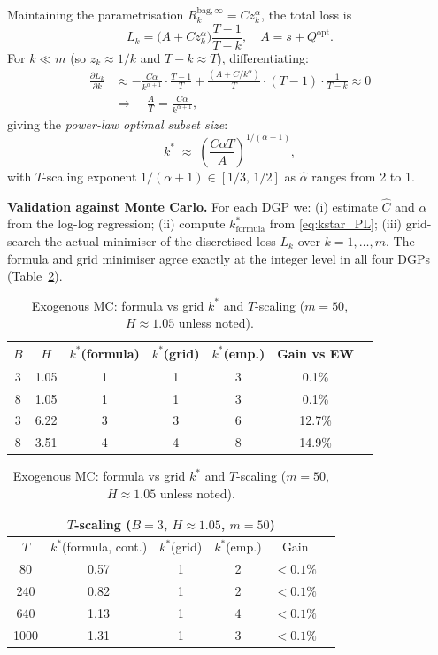 \documentclass[12pt,a4paper]{article}
\theoremstyle{definition}
\newcommand{\Qopt}{Q^{\mathrm{opt}}}
\newcommand{\Rk}{R_k^{\mathrm{bag},\infty}}
\begin{document}
Maintaining the parametrisation $\Rk=Cz_k^\alpha$, the total loss is
\begin{equation}\label{eq:Ltotal_PL}
  L_k = \bigl(A + Cz_k^\alpha\bigr)\frac{T-1}{T-k},\quad A=s+\Qopt.
\end{equation}
For $k\ll m$ (so $z_k\approx 1/k$ and $T-k\approx T$), differentiating:
\begin{align}
  \frac{\partial L_k}{\partial k}
  &\approx -\frac{C\alpha}{k^{\alpha+1}}\cdot\frac{T-1}{T}
           + \frac{(A+C/k^\alpha)}{T}\cdot(T-1)\cdot\frac{1}{T-k}
  \approx 0\nonumber\\
  &\Longrightarrow\quad
  \frac{A}{T} = \frac{C\alpha}{k^{\alpha+1}},
\end{align}
giving the \emph{power-law optimal subset size}:
\begin{equation}\label{eq:kstar_PL}
  k^* \;\approx\; \left(\frac{C\alpha T}{A}\right)^{1/(\alpha+1)},
\end{equation}
with $T$-scaling exponent $1/(\alpha+1)\in[1/3,\,1/2]$ as $\hat\alpha$
ranges from 2 to 1.

\textbf{Validation against Monte Carlo.}
For each DGP we: (i) estimate $\hat C$ and $\hat\alpha$ from the
log-log regression; (ii) compute $k^*_{\mathrm{formula}}$ from
\eqref{eq:kstar_PL}; (iii) grid-search the actual minimiser of the
discretised loss $L_k$ over $k=1,\ldots,m$.  The formula and grid minimiser
agree exactly at the integer level in all four DGPs (Table~\ref{tab:exo_kstar}).

\begin{table}[ht]
\centering
\caption{Exogenous MC: formula vs grid $k^*$ and $T$-scaling ($m=50$, $H\approx 1.05$
  unless noted).}
\label{tab:exo_kstar}
\begin{tabular}{ccccccc}
\toprule
$B$ & $H$ & $k^*$(formula) & $k^*$(grid) & $k^*$(emp.) & Gain vs EW \\
\midrule
3 & 1.05 & 1 & 1 & 3 & 0.1\% \\
8 & 1.05 & 1 & 1 & 3 & 0.1\% \\
3 & 6.22 & 3 & 3 & 6 & 12.7\% \\
8 & 3.51 & 4 & 4 & 8 & 14.9\% \\
\bottomrule
\end{tabular}

\medskip

\begin{tabular}{cccccc}
\toprule
\multicolumn{6}{c}{$T$-scaling ($B=3$, $H\approx 1.05$, $m=50$)} \\
\midrule
$T$ & $k^*$(formula, cont.) & $k^*$(grid) & $k^*$(emp.) & Gain \\
\midrule
80  & 0.57 & 1 & 2 & $<0.1\%$ \\
240 & 0.82 & 1 & 2 & $<0.1\%$ \\
640 & 1.13 & 1 & 4 & $<0.1\%$ \\
1000& 1.31 & 1 & 3 & $<0.1\%$ \\
\bottomrule
\end{tabular}
\end{table}
\end{document}
